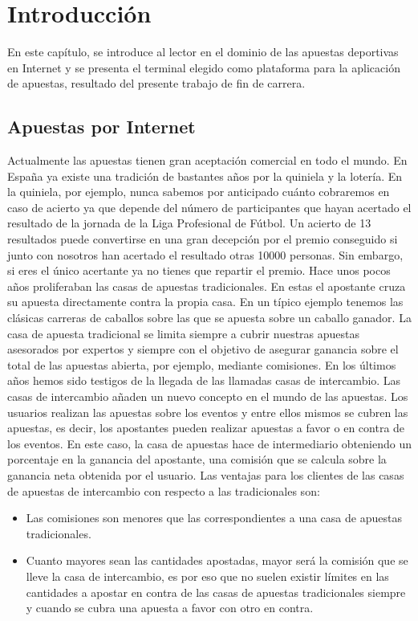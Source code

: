 \chapter{Introducción}
\label{ch:intro}

En este capítulo, se introduce al lector en el dominio de las apuestas deportivas en Internet y se presenta el terminal elegido como plataforma para la aplicación de apuestas, resultado del presente trabajo de fin de carrera.

\section{Apuestas por Internet}

Actualmente las apuestas tienen gran aceptación comercial en todo el mundo. En España ya existe una tradición de bastantes años por la quiniela y la lotería. En la quiniela, por ejemplo, nunca sabemos por anticipado cuánto cobraremos en caso de acierto ya que depende del número de participantes que hayan acertado el resultado de la jornada de la Liga Profesional de Fútbol. Un acierto de 13 resultados puede convertirse en una gran decepción por el premio conseguido si junto con nosotros han acertado el resultado otras 10000 personas. Sin embargo, si eres el único acertante ya no tienes que repartir el premio. 
 Hace unos pocos años proliferaban las casas de apuestas tradicionales. En estas el apostante cruza su apuesta directamente contra la propia casa. En un típico ejemplo tenemos las clásicas carreras de caballos sobre las que se apuesta sobre un caballo ganador. La casa de apuesta tradicional se limita siempre a cubrir nuestras apuestas asesorados por expertos y siempre con el objetivo de asegurar ganancia sobre el total de las apuestas abierta, por ejemplo, mediante comisiones. 
En los últimos años hemos sido testigos de la llegada de las llamadas casas de intercambio. 
Las casas de intercambio añaden un nuevo concepto en el mundo de las apuestas. Los usuarios realizan las apuestas sobre los eventos y entre ellos mismos se cubren las apuestas, es decir, los apostantes pueden realizar apuestas a favor o en contra de los eventos. 
 En este caso, la casa de apuestas hace de intermediario obteniendo un porcentaje en la ganancia del apostante, una comisión que se calcula sobre la ganancia neta obtenida por el usuario.
 Las ventajas para los clientes de las casas de apuestas de intercambio con respecto a las tradicionales son:
\begin{itemize}
	\item Las comisiones son menores que las correspondientes a una casa de apuestas tradicionales.
	\item Cuanto mayores sean las cantidades apostadas, mayor será la comisión que se lleve la casa de intercambio, es por eso que no suelen existir límites en las cantidades a apostar en contra de las casas de apuestas tradicionales siempre y cuando se cubra una apuesta a favor con otro en contra.
\end{itemize}
